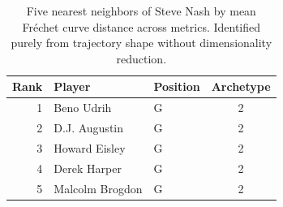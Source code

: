 \begin{table}[htbp]
  \centering\small
  \begin{tabular}{rllc}
    \toprule
    Rank & Player & Position & Archetype \\
    \midrule
    1 & Beno Udrih & G & 2 \\
    2 & D.J. Augustin & G & 2 \\
    3 & Howard Eisley & G & 2 \\
    4 & Derek Harper & G & 2 \\
    5 & Malcolm Brogdon & G & 2 \\
    \bottomrule
  \end{tabular}
  \caption{Five nearest neighbors of Steve Nash by mean Fr\'{e}chet curve distance across metrics. Identified purely from trajectory shape without dimensionality reduction.}
  \label{tab:Steve_Nash_frechet_curve_neighbors}
\end{table}

